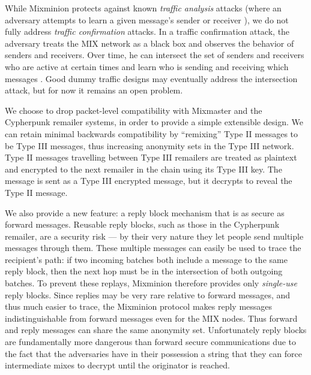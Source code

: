 \documentclass[11pt]{IEEEtran}
\begin{document}
While Mixminion protects against known \emph{traffic analysis} attacks
(where an adversary attempts to learn a given message's sender or
receiver \cite{rackoff93cryptographic,raymond00}), we do not fully
address \emph{traffic confirmation} attacks. In a traffic confirmation
attack, the adversary treats the MIX network as a black box and
observes the behavior of senders and receivers. Over time, he can
intersect the set of senders and receivers who are active at certain
times and learn who is sending and receiving which messages
\cite{langos02}. Good dummy traffic designs may eventually address the
intersection attack, but for now it remains an open problem.

We choose to drop packet-level compatibility with Mixmaster and the
Cypherpunk remailer systems, in order to provide a simple extensible
design. We can retain minimal backwards compatibility by ``remixing''
Type II messages to be Type III messages, thus increasing anonymity
sets in the Type III network. Type II messages travelling between
Type III remailers are treated
as plaintext and encrypted to the next remailer in the chain using its
Type III key. The message is sent as a Type III encrypted message, but
it decrypts to reveal the Type II message.

We also provide a new feature: a reply block mechanism that is as secure
as forward messages.
Reusable reply blocks, such as those in the Cypherpunk remailer, are a
security risk --- by their very nature they let people send multiple
messages through them.  These multiple messages can easily be used to
trace the recipient's path: if two incoming batches both include a
message to the same reply block, then the next hop must be in the
intersection of both outgoing batches.  To prevent these replays,
Mixminion therefore provides only \emph{single-use} reply blocks. Since
replies may be very rare relative to forward messages, and thus
much easier to trace, the Mixminion protocol makes reply messages
indistinguishable from forward messages even for the MIX nodes. Thus
forward and reply messages can share the same anonymity
set. Unfortunately reply blocks are fundamentally more dangerous than
forward secure communications due to the fact that the adversaries have
in their possession a string that they can force intermediate mixes to
decrypt until the originator is reached.
\end{document}
